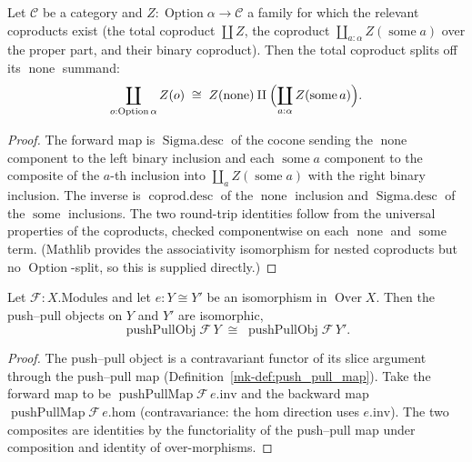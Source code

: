 \begin{lemma}\label{mk-lem:sigmaOptionIso}
  \leanok

  Let \(\mathcal{C}\) be a category and \(Z : \operatorname{Option}\alpha \to \mathcal{C}\) a family
  for which the relevant coproducts exist (the total coproduct \(\coprod Z\), the coproduct
  \(\coprod_{a : \alpha} Z(\operatorname{some} a)\) over the proper part, and their binary coproduct).
  Then the total coproduct splits off its \(\operatorname{none}\) summand:
  \[
    \coprod_{o : \operatorname{Option}\alpha} Z(o) \;\cong\; Z(\operatorname{none}) \amalg
      \Bigl(\coprod_{a : \alpha} Z(\operatorname{some} a)\Bigr).
  \]
\end{lemma}
\begin{proof}

  The forward map is \(\operatorname{Sigma.desc}\) of the cocone sending the \(\operatorname{none}\)
  component to the left binary inclusion and each \(\operatorname{some} a\) component to the composite
  of the \(a\)-th inclusion into \(\coprod_{a} Z(\operatorname{some} a)\) with the right binary
  inclusion. The inverse is \(\operatorname{coprod.desc}\) of the \(\operatorname{none}\) inclusion and
  \(\operatorname{Sigma.desc}\) of the \(\operatorname{some}\) inclusions. The two round-trip identities
  follow from the universal properties of the coproducts, checked componentwise on each
  \(\operatorname{none}\) and \(\operatorname{some}\) term. (Mathlib provides the associativity
  isomorphism for nested coproducts but no \(\operatorname{Option}\)-split, so this is supplied
  directly.)
\end{proof}

\begin{lemma}\label{mk-lem:pushPullObjCongr}
  \leanok

  Let \(\mathcal{F} : X.\mathrm{Modules}\) and let \(e : Y \cong Y'\) be an isomorphism in
  \(\operatorname{Over} X\). Then the push--pull objects on \(Y\) and \(Y'\) are isomorphic,
  \[
    \operatorname{pushPullObj}\mathcal{F}\,Y \;\cong\; \operatorname{pushPullObj}\mathcal{F}\,Y'.
  \]
\end{lemma}
\begin{proof}
  The push--pull object is a contravariant functor of its slice argument through the push--pull map
  (Definition~\ref{mk-def:push_pull_map}). Take the forward map to be
  \(\operatorname{pushPullMap}\mathcal{F}\,e.\mathrm{inv}\) and the backward map
  \(\operatorname{pushPullMap}\mathcal{F}\,e.\mathrm{hom}\) (contravariance: the \(\mathrm{hom}\)
  direction uses \(e.\mathrm{inv}\)). The two composites are identities by the functoriality of the
  push--pull map under composition and identity of over-morphisms.
\end{proof}

